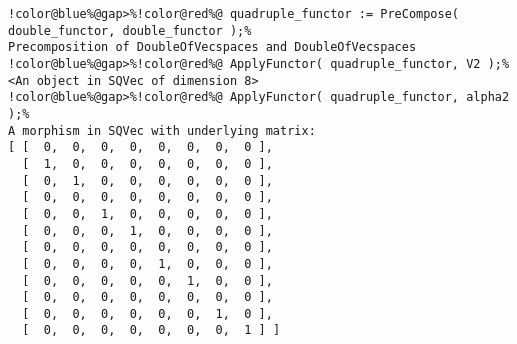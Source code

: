 \begin{Verbatim}[commandchars=!@\%,frame=single]
!color@blue%@gap>%!color@red%@ quadruple_functor := PreCompose( double_functor, double_functor );%
Precomposition of DoubleOfVecspaces and DoubleOfVecspaces
!color@blue%@gap>%!color@red%@ ApplyFunctor( quadruple_functor, V2 );%
<An object in SQVec of dimension 8>
!color@blue%@gap>%!color@red%@ ApplyFunctor( quadruple_functor, alpha2 );%
A morphism in SQVec with underlying matrix:
[ [  0,  0,  0,  0,  0,  0,  0,  0 ],
  [  1,  0,  0,  0,  0,  0,  0,  0 ],
  [  0,  1,  0,  0,  0,  0,  0,  0 ],
  [  0,  0,  0,  0,  0,  0,  0,  0 ],
  [  0,  0,  1,  0,  0,  0,  0,  0 ],
  [  0,  0,  0,  1,  0,  0,  0,  0 ],
  [  0,  0,  0,  0,  0,  0,  0,  0 ],
  [  0,  0,  0,  0,  1,  0,  0,  0 ],
  [  0,  0,  0,  0,  0,  1,  0,  0 ],
  [  0,  0,  0,  0,  0,  0,  0,  0 ],
  [  0,  0,  0,  0,  0,  0,  1,  0 ],
  [  0,  0,  0,  0,  0,  0,  0,  1 ] ]

\end{Verbatim}
